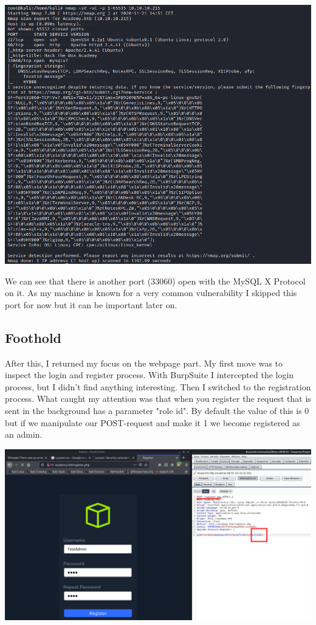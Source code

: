 \documentclass[../main.tex]{subfiles}
\begin{document}
\includegraphics[width=\linewidth]{images/Robbe/Academy_scanning2.png}

We can see that there is another port (33060) open with the MySQL X Protocol on it. As my machine is known for a very common vulnerability I skipped this port for now but it can be important later on.
\pagebreak
\subsection{Foothold}
After this, I returned my focus on the webpage part. My first move was to inspect the login and register process. With BurpSuite I intercepted the login process, but I didn't find anything interesting. Then I switched to the registration process. What caught my attention was that when you register the request that is sent in the background has a parameter "role id". By default the value of this is 0 but if we manipulate our POST-request and make it 1 we become registered  as an admin.

\includegraphics[width=\linewidth]{images/Robbe/Academy_http3.png}
\end{document}
